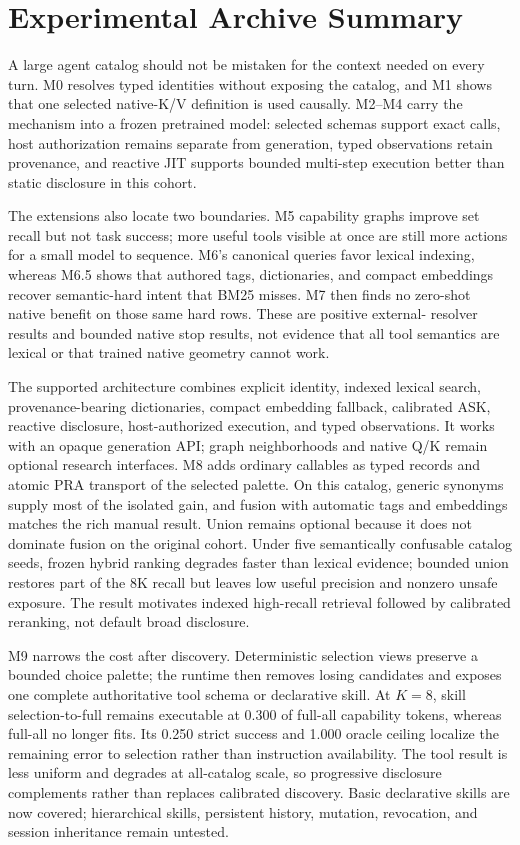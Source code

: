 \section{Experimental Archive Summary}
A large agent catalog should not be mistaken for the context needed on every
turn. M0 resolves typed identities without exposing the catalog, and M1 shows
that one selected native-K/V definition is used causally. M2--M4 carry the
mechanism into a frozen pretrained model: selected schemas support exact calls,
host authorization remains separate from generation, typed observations retain
provenance, and reactive JIT supports bounded multi-step execution better than
static disclosure in this cohort.

The extensions also locate two boundaries. M5 capability graphs improve set
recall but not task success; more useful tools visible at once are still more
actions for a small model to sequence. M6's canonical queries favor lexical
indexing, whereas M6.5 shows that authored tags, dictionaries, and compact
embeddings recover semantic-hard intent that BM25 misses. M7 then finds no
zero-shot native benefit on those same hard rows. These are positive external-
resolver results and bounded native stop results, not evidence that all tool
semantics are lexical or that trained native geometry cannot work.

The supported architecture combines explicit identity, indexed lexical search,
provenance-bearing dictionaries, compact embedding fallback, calibrated ASK,
reactive disclosure, host-authorized execution, and typed observations. It
works with an opaque generation API; graph neighborhoods and native Q/K remain
optional research interfaces. M8 adds ordinary callables as typed records and
atomic PRA transport of the selected palette. On this catalog, generic synonyms
supply most of the isolated gain, and fusion with automatic tags and embeddings
matches the rich manual result. Union remains optional because it does not
dominate fusion on the original cohort. Under five semantically confusable
catalog seeds, frozen hybrid ranking degrades faster than lexical evidence;
bounded union restores part of the 8K recall but leaves low useful precision
and nonzero unsafe exposure. The result motivates indexed high-recall retrieval
followed by calibrated reranking, not default broad disclosure.

M9 narrows the cost after discovery. Deterministic selection views preserve a
bounded choice palette; the runtime then removes losing candidates and exposes
one complete authoritative tool schema or declarative skill. At $K=8$, skill
selection-to-full remains executable at 0.300 of full-all capability tokens,
whereas full-all no longer fits. Its 0.250 strict success and 1.000 oracle
ceiling localize the remaining error to selection rather than instruction
availability. The tool result is less uniform and degrades at all-catalog scale, so
progressive disclosure complements rather than replaces calibrated discovery.
Basic declarative skills are now covered; hierarchical skills, persistent
history, mutation, revocation, and session inheritance remain untested.

